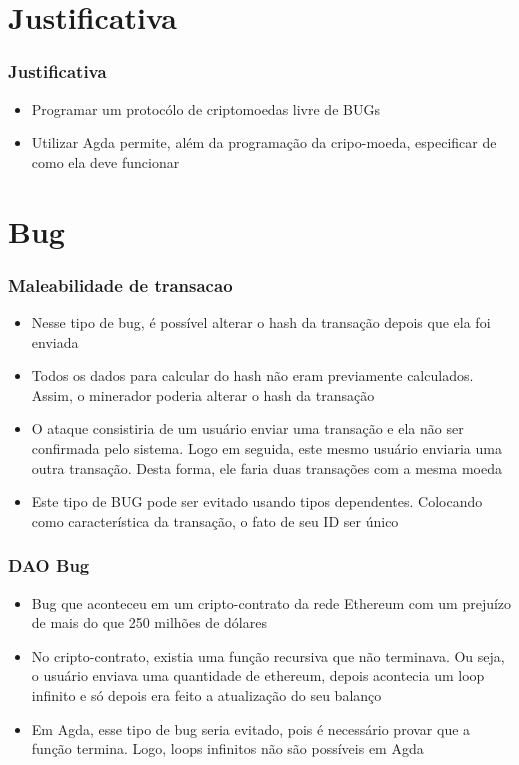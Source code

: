 \documentclass{beamer}
\begin{document}
\section{Justificativa}

 \begin{frame}
\frametitle{Justificativa}
\begin{itemize}
    \item Programar um protocólo de criptomoedas livre de BUGs
    \item Utilizar Agda permite, além da programação da cripo-moeda, especificar de como ela deve funcionar 
\end{itemize}
\end{frame}

\section{Bug}

 \begin{frame}
   \frametitle{Maleabilidade de transacao}
\begin{itemize}
  \item Nesse tipo de bug, é possível alterar o hash da transação depois que ela foi enviada
  \item Todos os dados para calcular do hash não eram previamente calculados. Assim, o minerador poderia alterar o hash da transação
  \item O ataque consistiria de um usuário enviar uma transação e ela não ser confirmada pelo sistema.
    Logo em seguida, este mesmo usuário enviaria uma outra transação. Desta forma, ele faria duas transações com a mesma moeda
  \item Este tipo de BUG pode ser evitado usando tipos dependentes. Colocando como característica da transação, o fato de seu ID ser único
\end{itemize}
\end{frame}

\begin{frame}
  \frametitle{DAO Bug}
  \begin{itemize}
    \item Bug que aconteceu em um cripto-contrato da rede Ethereum com um prejuízo de mais do que 250 milhões de dólares
    \item No cripto-contrato, existia uma função recursiva que não terminava. Ou seja, o usuário enviava uma quantidade de ethereum, depois acontecia um loop infinito e só depois era feito a atualização do seu balanço
    \item Em Agda, esse tipo de bug seria evitado, pois é necessário provar que a função termina. Logo, loops infinitos não são possíveis em Agda
  \end{itemize}
\end{frame}
\end{document}
